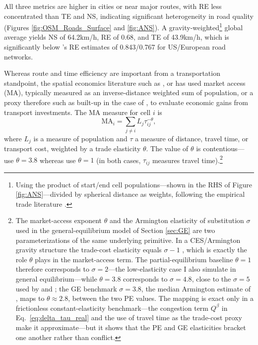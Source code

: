\documentclass[a4paper]{article}
\begin{document}
All three metrics are higher in cities or near major routes, with RE less concentrated than TE and NS, indicating significant heterogeneity in road quality (Figures \ref{fig:OSM_Roads_Surface} and \ref{fig:ANS}). A gravity-weighted\footnote{Using the product of start/end cell populations---shown in the RHS of Figure \ref{fig:ANS}---divided by spherical distance as weights, following the empirical trade literature \citep{head2014gravity, zipf1946p, poot2016gravity}.} global average yields NS of 64.2km/h, RE of 0.68, and TE of 43.9km/h, which is significantly below \citet{wolfram2021efficiency}'s RE estimates of 0.843/0.767 for US/European road networks. \newline



Whereas route and time efficiency are important from a transportation standpoint, the spatial economics literature such as \citet{donaldson2016railroads}, \citet{jedwab2022average} or \citet{Peng2021} has used market access (MA), typically measured as an inverse-distance weighted sum of population, or a proxy therefore such as built-up in the case of \citet{Peng2021}, to evaluate economic gains from transport investments. The MA measure for cell $i$ is
\begin{equation} \label{eq:MA}
\text{MA}_i = \sum_{j\neq i} L_j \tau_{ij}^{-\theta},
\end{equation}
where $L_j$ is a measure of population and $\tau$ a measure of distance, travel time, or transport cost, weighted by a trade elasticity $\theta$. The value of $\theta$ is contentious---\citet{jedwab2022average} use $\theta = 3.8$ whereas \citet{Peng2021} use $\theta = 1$ (in both cases, $\tau_{ij}$ measures travel time).\footnote{\label{fn:theta_sigma}The market-access exponent $\theta$ and the Armington elasticity of substitution $\sigma$ used in the general-equilibrium model of Section \ref{sec:GE} are two parameterizations of the same underlying primitive. In a CES/Armington gravity structure the trade-cost elasticity equals $\sigma - 1$ \citep{head2014gravity}, which is exactly the role $\theta$ plays in the \citet{donaldson2016railroads} market-access term. The partial-equilibrium baseline $\theta = 1$ therefore corresponds to $\sigma = 2$---the low-elasticity case I also simulate in general equilibrium---while $\theta = 3.8$ corresponds to $\sigma = 4.8$, close to the $\sigma = 5$ used by \citet{fajgelbaum2020optimal} and \citet{graff2019spatial}; the GE benchmark $\sigma = 3.8$, the median Armington estimate of \citet{bajzik2020estimating}, maps to $\theta \approx 2.8$, between the two PE values. The mapping is exact only in a frictionless constant-elasticity benchmark---the congestion term $Q^\beta$ in Eq.\ \ref{eq:delta_tau_real} and the use of travel time as the trade-cost proxy make it approximate---but it shows that the PE and GE elasticities bracket one another rather than conflict.} \newline
 
\end{document}
